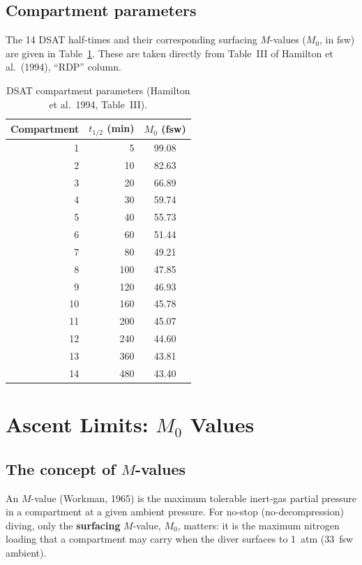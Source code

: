 \documentclass[11pt,letterpaper]{article}
\begin{document}
\subsection{Compartment parameters}

The 14 DSAT half-times and their corresponding surfacing $M$-values
($M_0$, in fsw) are given in Table~\ref{tab:params}.  These are taken
directly from Table~III of Hamilton et al.\ (1994), ``RDP'' column.

\begin{table}[h]
\centering
\caption{DSAT compartment parameters (Hamilton et al.\ 1994, Table~III).}
\label{tab:params}
\begin{tabular}{@{}rrc@{}}
\toprule
Compartment & $t_{1/2}$ (min) & $M_0$ (fsw) \\
\midrule
 1 &   5 & 99.08 \\
 2 &  10 & 82.63 \\
 3 &  20 & 66.89 \\
 4 &  30 & 59.74 \\
 5 &  40 & 55.73 \\
 6 &  60 & 51.44 \\
 7 &  80 & 49.21 \\
 8 & 100 & 47.85 \\
 9 & 120 & 46.93 \\
10 & 160 & 45.78 \\
11 & 200 & 45.07 \\
12 & 240 & 44.60 \\
13 & 360 & 43.81 \\
14 & 480 & 43.40 \\
\bottomrule
\end{tabular}
\end{table}


\section{Ascent Limits: $M_0$ Values}

\subsection{The concept of $M$-values}

An $M$-value (Workman, 1965) is the maximum tolerable inert-gas partial
pressure in a compartment at a given ambient pressure.  For no-stop
(no-decompression) diving, only the \textbf{surfacing} $M$-value, $M_0$,
matters: it is the maximum nitrogen loading that a compartment may
carry when the diver surfaces to 1~atm ($33$~fsw ambient).
\end{document}
